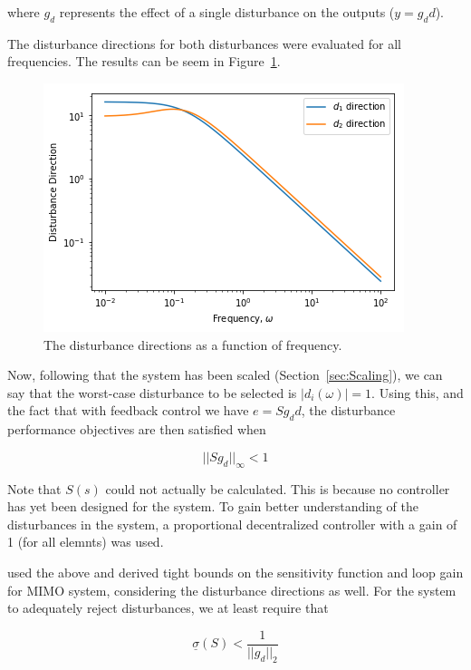 where $g_d$ represents the effect of a single disturbance on the outputs ($y = g_dd$).

The disturbance directions for both disturbances were evaluated for all frequencies. The results can be seem in Figure~\ref{fig:disturbance-direction}.

\begin{figure}[H]
	\centering
	\includegraphics[width=0.7\linewidth]{"Figures/Disturbance Direction"}
	\caption{The disturbance directions as a function of frequency.}
	\label{fig:disturbance-direction}
\end{figure}

Now, following that the system has been scaled (Section~\ref{sec:Scaling}), we can say that the worst-case disturbance to be selected is $|d_i(\omega)| = 1$. Using this, and the fact that with feedback control we have $e = Sg_dd$, the disturbance performance objectives are then satisfied when

\begin{equation}
	||Sg_d||_{\infty} < 1
\end{equation}

Note that $S(s)$ could not actually be calculated. This is because no controller has yet been designed for the system. To gain better understanding of the disturbances in the system, a proportional decentralized controller with a gain of 1 (for all elemnts) was used.

\textcite{skogestad} used the above and derived tight bounds on the sensitivity function and loop gain for MIMO system, considering the disturbance directions as well. For the system to adequately reject disturbances, we at least require that 

\begin{equation}
	\label{eq: Disturbance Criteria 1}
	\underline{\sigma}(S) < \frac{1}{||g_d||_2}
\end{equation}

